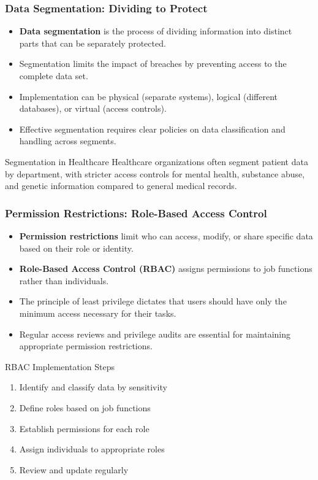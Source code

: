 \documentclass{beamer}
\begin{document}
\begin{frame}
    \frametitle{Data Segmentation: Dividing to Protect}
    \begin{itemize}
        \item \textbf{Data segmentation} is the process of dividing information into distinct parts that can be separately protected.
        \item Segmentation limits the impact of breaches by preventing access to the complete data set.
        \item Implementation can be physical (separate systems), logical (different databases), or virtual (access controls).
        \item Effective segmentation requires clear policies on data classification and handling across segments.
    \end{itemize}
    
    \begin{exampleblock}{Segmentation in Healthcare}
    Healthcare organizations often segment patient data by department, with stricter access controls for mental health, substance abuse, and genetic information compared to general medical records.
    \end{exampleblock}
    \end{frame}
    
    \begin{frame}
    \frametitle{Permission Restrictions: Role-Based Access Control}
    \begin{itemize}
        \item \textbf{Permission restrictions} limit who can access, modify, or share specific data based on their role or identity.
        \item \textbf{Role-Based Access Control (RBAC)} assigns permissions to job functions rather than individuals.
        \item The principle of least privilege dictates that users should have only the minimum access necessary for their tasks.
        \item Regular access reviews and privilege audits are essential for maintaining appropriate permission restrictions.
    \end{itemize}
    
    \begin{block}{RBAC Implementation Steps}
        \begin{enumerate}
            \item Identify and classify data by sensitivity
            \item Define roles based on job functions
            \item Establish permissions for each role
            \item Assign individuals to appropriate roles
            \item Review and update regularly
        \end{enumerate}
    \end{block}
    \end{frame}
    
\end{document}

